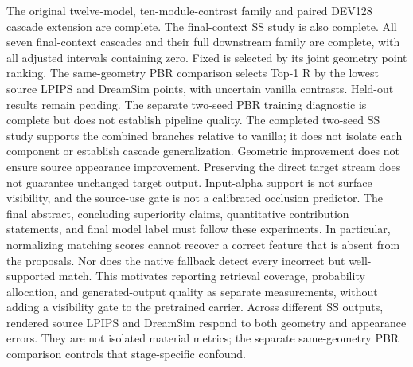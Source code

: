 \documentclass[10pt]{article}
\begin{document}
The original twelve-model, ten-module-contrast family and paired DEV128
cascade extension are complete. The final-context SS study is also complete.
All seven final-context cascades and their full downstream family are complete,
with all adjusted intervals containing zero. Fixed is selected by its joint
geometry point ranking. The same-geometry PBR comparison selects Top-1 R by
the lowest source LPIPS and DreamSim points, with uncertain vanilla contrasts.
Held-out results remain pending. The separate two-seed PBR
training diagnostic is complete but does not establish pipeline quality.
The completed two-seed SS study supports the combined branches relative to
vanilla; it does not isolate each component or establish cascade generalization.
Geometric improvement
does not ensure source appearance improvement. Preserving the direct target
stream does not guarantee unchanged target output. Input-alpha support is not
surface visibility, and the source-use gate is not a calibrated occlusion
predictor. The final abstract, concluding superiority claims, quantitative
contribution statements, and final model label must follow these experiments.
In particular, normalizing matching scores cannot recover a correct feature
that is absent from the proposals. Nor does the native fallback detect every
incorrect but well-supported match. This motivates reporting retrieval
coverage, probability allocation, and generated-output quality as separate
measurements, without adding a visibility gate to the pretrained carrier.
Across different SS outputs, rendered source LPIPS and DreamSim respond to
both geometry and appearance errors. They are not isolated material metrics;
the separate same-geometry PBR comparison controls that stage-specific
confound.
\clearpage


\end{document}
